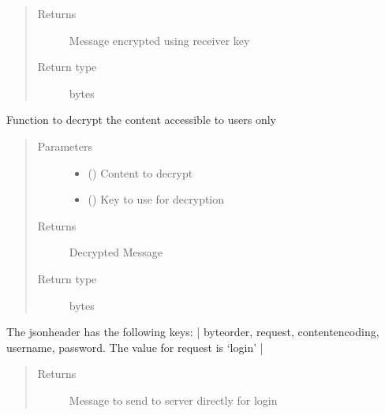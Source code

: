 \documentclass[letterpaper,10pt,english]{sphinxmanual}
\begin{document}
\begin{fulllineitems}
\begin{fulllineitems}
\begin{quote}
\begin{description}
\begin{itemize}
\end{itemize}

\item[{Returns}] \leavevmode
Message encrypted using receiver key

\item[{Return type}] \leavevmode
bytes

\end{description}\end{quote}

\end{fulllineitems}


\begin{fulllineitems}
\label{\detokenize{Message:Message.Message._decrypt}}
Function to decrypt the content accessible to users only
\begin{quote}\begin{description}
\item[{Parameters}] \leavevmode\begin{itemize}
\item {} 
 () \textendash{} Content to decrypt

\item {} 
 () \textendash{} Key to use for decryption

\end{itemize}

\item[{Returns}] \leavevmode
Decrypted Message

\item[{Return type}] \leavevmode
bytes

\end{description}\end{quote}

\end{fulllineitems}


\begin{fulllineitems}
\label{\detokenize{Message:Message.Message._create_login_request}}
The jsonheader has the following keys: |
byteorder, request, content\sphinxhyphen{}encoding, username, password. The value for request is ‘login’ |
\begin{quote}\begin{description}
\item[{Returns}] \leavevmode
Message to send to server directly for login


\end{description}
\end{quote}
\end{fulllineitems}
\end{fulllineitems}
\end{document}
